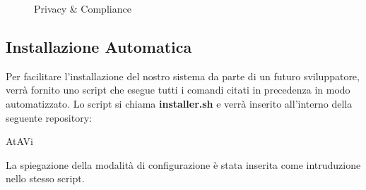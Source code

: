 \documentclass[../ManualeSviluppatore_v2.0.0.tex]{subfiles}
\begin{document}
\begin{enumerate}
\begin{itemize}
\begin{figure}[!h]
						\caption{Privacy \& Compliance}
					\end{figure}
				\end{itemize}
		\end{enumerate}
	\subsection{Installazione Automatica}
		Per facilitare l'installazione del nostro sistema da parte di un futuro sviluppatore, verrà fornito uno script che esegue tutti i comandi citati in precedenza in modo automatizzato. Lo script si chiama \textbf{installer.sh} e verrà inserito all'interno della seguente repository:
		\begin{center}
			AtAVi
		\end{center}
		La spiegazione della modalità di configurazione è stata inserita come intruduzione nello stesso script.
\end{document}
